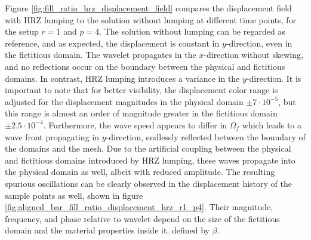 Figure \ref{fig:fill_ratio_hrz_displacement_field} compares the displacement field with HRZ lumping to the solution without lumping at different time points, for the setup $r=1$ and $p=4$. The solution without lumping can be regarded as reference, and as expected, the displacement is constant in $y$-direction, even in the fictitious domain. The wavelet propagates in the $x$-direction without skewing, and no reflections occur on the boundary between the physical and fictitious domains. In contrast, HRZ lumping introduces a variance in the $y$-direction. It is important to note that for better visibility, the displacement color range is adjusted for the displacement magnitudes in the physical domain $\pm 7\cdot 10^{-5}$, but this range is almost an order of magnitude greater in the fictitious domain $\pm 2.5 \cdot 10^{-4}$. Furthermore, the wave speed appears to differ in $\Omega_f$ which leads to a wave front propagating in $y$-direction, endlessly reflected between the boundary of the domains and the mesh. Due to the artificial coupling between the physical and fictitious domains introduced by HRZ lumping, these waves propagate into the physical domain as well, albeit with reduced amplitude. The resulting spurious oscillations can be clearly observed in the displacement history of the sample points as well, shown in figure \ref{fig:aligned_bar_fill_ratio_displacement_hrz_r1_p4}. Their magnitude, frequency, and phase relative to wavelet depend on the size of the fictitious domain and the material properties inside it, defined by $\beta$.

